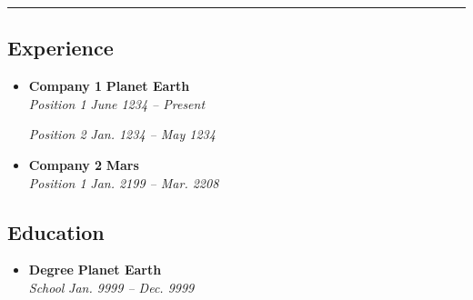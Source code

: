 



\hrule
\vspace{-0.4em}
\subsection*{Experience}

\begin{itemize}
  \parskip=0.1em

  \item
  \headerrow
    {\textbf{Company 1}}
    {\textbf{Planet Earth}}
  \\
  \headerrow
    {\emph{Position 1}}
    {\emph{June 1234 -- Present}}
  \headerrow
    {\emph{Position 2}}
    {\emph{Jan. 1234 -- May 1234}}

  \item
  \headerrow
    {\textbf{Company 2}}
    {\textbf{Mars}}
  \\
  \headerrow
    {\emph{Position 1}}
    {\emph{Jan. 2199 -- Mar. 2208}}

\end{itemize}

\subsection*{Education}

\begin{itemize}
  \parskip=0.1em

  \item
  \headerrow
    {\textbf{Degree}}
    {\textbf{Planet Earth}}
  \\
  \headerrow
    {\emph{School}}
    {\emph{Jan. 9999 -- Dec. 9999}}

\end{itemize}

